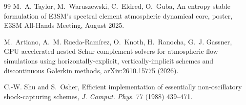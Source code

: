 \documentclass[11pt,a4paper]{article}
\begin{document}
\begin{thebibliography}{99}
M.~A. Taylor, M.~Waruszewski, C.~Eldred, O.~Guba,
An entropy stable formulation of E3SM's spectral element atmospheric
dynamical core, poster, E3SM All-Hands Meeting, August 2025.

M.~Artiano, A.~M. Rueda-Ram\'irez, O.~Knoth, H.~Ranocha, G.~J. Gassner,
GPU-accelerated nested Schur-complement solvers for atmospheric flow
simulations using horizontally-explicit, vertically-implicit schemes and
discontinuous Galerkin methods, arXiv:2610.15775 (2026).

C.-W. Shu and S.~Osher,
Efficient implementation of essentially non-oscillatory shock-capturing
schemes,
\emph{J. Comput. Phys.} 77 (1988) 439--471.
\end{thebibliography}
\end{document}
